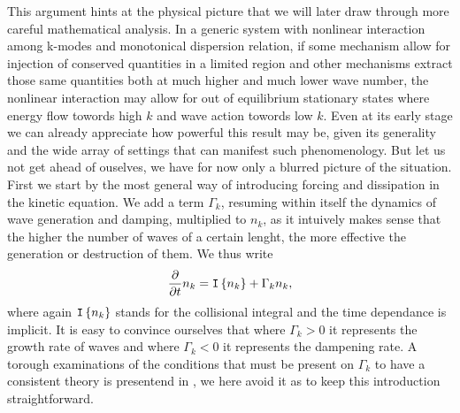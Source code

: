 This argument hints at the physical picture that we will later draw through more careful mathematical analysis. In a generic system with nonlinear interaction among 
k-modes and monotonical dispersion relation, if some mechanism allow for injection of conserved quantities in a limited region and other mechanisms extract those
same quantities both at much higher and much lower wave number, the nonlinear interaction may allow for out of equilibrium stationary states where energy flow towords high
$k$ and wave action towords low $k$. Even at its early stage we can already appreciate how powerful this result may be, given its generality and the wide array of settings
that can manifest such phenomenology. But let us not get ahead of ouselves, we have for now only a blurred picture of the situation. \\

First we start by the most general way of introducing forcing and dissipation in the kinetic equation. We add a term $\Gamma_k$, resuming within itself the dynamics of 
wave generation and damping, multiplied to $n_k$, as it intuively makes sense that the higher the number of waves of a certain lenght, the more effective the generation
or destruction of them. We thus write
\begin{equation}
    \frac{\partial}{\partial t} n_k = \mathtt{I}\left\{n_k\right\} + \Gamma_k n_k, 
    \label{kineticgamma}
\end{equation} 
where again $\mathtt{I}\left\{n_k\right\}$ stands for the collisional integral and the time dependance is implicit. It is easy to convince ourselves that where $\Gamma_k > 0$ it represents the growth rate of waves and 
where $\Gamma_k < 0$ it represents the dampening rate. A torough examinations of the conditions that must be present on $\Gamma_k$ to have a consistent theory
is presentend in \cite{Zakharov}, we here avoid it as to keep this introduction straightforward.\\

